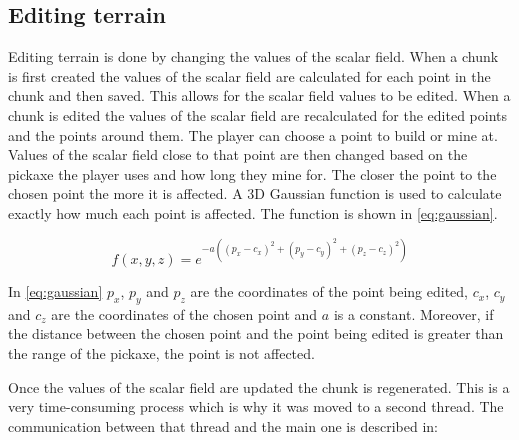 \subsection{Editing terrain} \label{sec:terrain_editing}
Editing terrain is done by changing the values of the scalar field.
When a chunk is first created the values of the scalar field are calculated for each point in the chunk and then saved.
This allows for the scalar field values to be edited.
When a chunk is edited the values of the scalar field are recalculated for the edited points and the points around them.
The player can choose a point to build or mine at.
Values of the scalar field close to that point are then changed based on the pickaxe the player uses and how long they mine for.
The closer the point to the chosen point the more it is affected.
A 3D Gaussian function is used to calculate exactly how much each point is affected.
The function is shown in \autoref{eq:gaussian}.

\begin{equation}
    \label{eq:gaussian}
    f(x,y,z) = e^{-a \left((p_x - c_x)^2 + (p_y - c_y)^2 + (p_z - c_z)^2\right)}
\end{equation}

In \autoref{eq:gaussian} $p_x$, $p_y$ and $p_z$ are the coordinates of the point being edited, $c_x$, $c_y$ and $c_z$ are the coordinates of the chosen point and $a$ is a constant.
Moreover, if the distance between the chosen point and the point being edited is greater than the range of the pickaxe, the point is not affected.

Once the values of the scalar field are updated the chunk is regenerated.
This is a very time-consuming process which is why it was moved to a second thread.
The communication between that thread and the main one is described in: 